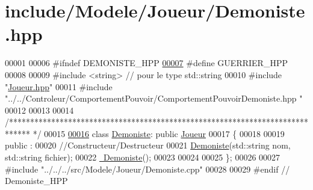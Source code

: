 \hypertarget{_demoniste_8hpp_source}{\section{include/\-Modele/\-Joueur/\-Demoniste.hpp}
}

\begin{DoxyCode}
00001 
00006 \textcolor{preprocessor}{#ifndef DEMONISTE\_HPP}
\hypertarget{_demoniste_8hpp_source_l00007}{}\hyperlink{_demoniste_8hpp_a2a3decece95c07c217e7bdc071aa9efc}{00007} \textcolor{preprocessor}{}\textcolor{preprocessor}{#define GUERRIER\_HPP}
00008 \textcolor{preprocessor}{}
00009 \textcolor{preprocessor}{#include <string>} \textcolor{comment}{// pour le type std::string}
00010 \textcolor{preprocessor}{#include "\hyperlink{_joueur_8hpp}{Joueur.hpp}"}
00011 \textcolor{preprocessor}{#include "../../Controleur/ComportementPouvoir/ComportementPouvoirDemoniste.hpp
      "}
00012 
00013 
00014 \textcolor{comment}{/*****************************************************************************
      */}
00015 
\hypertarget{_demoniste_8hpp_source_l00016}{}\hyperlink{class_demoniste}{00016} \textcolor{keyword}{class }\hyperlink{class_demoniste}{Demoniste}: \textcolor{keyword}{public} \hyperlink{class_joueur}{Joueur}
00017 \{   
00018 
00019    \textcolor{keyword}{public} :
00020       \textcolor{comment}{//Constructeur/Destructeur}
00021       \hyperlink{class_demoniste_af380ca447e054e2096618ac7e2607c5a}{Demoniste}(std::string nom, std::string fichier);
00022       \hyperlink{class_demoniste_ae66a10386b9ec772fe4b3d9e94deffe8}{~Demoniste}();
00023    
00024   
00025 \};
00026 
00027 \textcolor{preprocessor}{#include "../../../src/Modele/Joueur/Demoniste.cpp"}
00028 
00029 \textcolor{preprocessor}{#endif // Demoniste\_HPP}
\end{DoxyCode}
